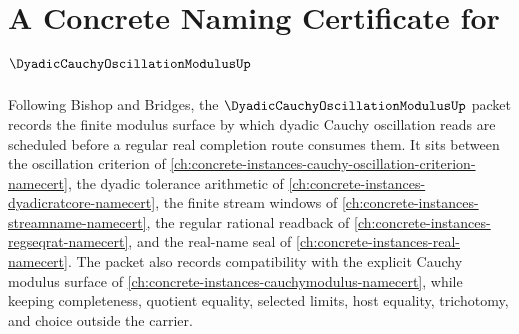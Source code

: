 \chapter{A Concrete Naming Certificate for $\DyadicCauchyOscillationModulusUp$}
\label{ch:concrete-instances-dyadic-cauchy-oscillation-modulus-namecert}

Following Bishop and Bridges, the $\DyadicCauchyOscillationModulusUp$ packet records the finite modulus surface by which dyadic Cauchy oscillation reads are scheduled before a regular real completion route consumes them. It sits between the oscillation criterion of \autoref{ch:concrete-instances-cauchy-oscillation-criterion-namecert}, the dyadic tolerance arithmetic of \autoref{ch:concrete-instances-dyadicratcore-namecert}, the finite stream windows of \autoref{ch:concrete-instances-streamname-namecert}, the regular rational readback of \autoref{ch:concrete-instances-regseqrat-namecert}, and the real-name seal of \autoref{ch:concrete-instances-real-namecert}. The packet also records compatibility with the explicit Cauchy modulus surface of \autoref{ch:concrete-instances-cauchymodulus-namecert}, while keeping completeness, quotient equality, selected limits, host equality, trichotomy, and choice outside the carrier.

